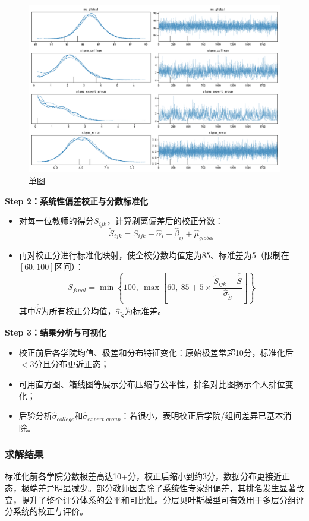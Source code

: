 \documentclass[withoutpreface,bwprint]{cumcmthesis}
\begin{document}
\begin{figure}[H]
\centering
\includegraphics[width=1\textwidth]{figures/Diagnostics/trace_plots.png}
\caption{单图}
\label{fig:单图}
\end{figure}

\textbf{Step 2：系统性偏差校正与分数标准化}
\begin{itemize}
    \item 对每一位教师的得分$S_{ijk}$，计算剥离偏差后的校正分数：
    $$
    \widetilde{S}_{ijk} = S_{ijk} - \widehat{\alpha}_i - \widehat{\beta}_{ij} + \widehat{\mu}_{global}
    $$
    \item 再对校正分进行标准化映射，使全校分数均值定为85、标准差为5（限制在$[60,100]$区间）：
    $$
    S_{final} = \min \left\{100,\ \max\left[60,\ 85 + 5 \times \frac{\widetilde{S}_{ijk} - \overline{\widetilde{S}}}{\widehat{\sigma}_{\widetilde{S}}}\right]\right\}
    $$
    其中$\overline{\widetilde{S}}$为所有校正分均值，$\widehat{\sigma}_{\widetilde{S}}$为标准差。
\end{itemize}
\textbf{Step 3：结果分析与可视化}
\begin{itemize}
    \item 校正前后各学院均值、极差和分布特征变化：原始极差常超10分，标准化后$<3$分且分布更近正态；
    \item 可用直方图、箱线图等展示分布压缩与公平性，排名对比图揭示个人排位变化；
    \item 后验分析$\widehat{\sigma}_{college}$和$\widehat{\sigma}_{expert\_group}$：若很小，表明校正后学院/组间差异已基本消除。
\end{itemize}

\subsubsection{求解结果}
标准化前各学院分数极差高达10+分，校正后缩小到约3分，数据分布更接近正态，极端差异明显减少。部分教师因去除了系统性专家组偏差，其排名发生显著改变，提升了整个评分体系的公平和可比性。分层贝叶斯模型可有效用于多层分组评分系统的校正与评价。
\end{document}
